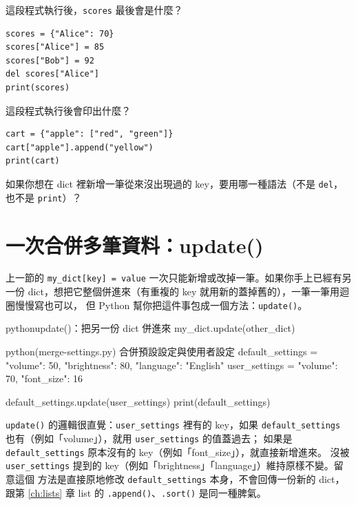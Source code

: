 \begin{drills}[label=drills:dict-modify]
\item 這段程式執行後，\texttt{scores} 最後會是什麼？
\begin{verbatim}
scores = {"Alice": 70}
scores["Alice"] = 85
scores["Bob"] = 92
del scores["Alice"]
print(scores)
\end{verbatim}
\item 這段程式執行後會印出什麼？
\begin{verbatim}
cart = {"apple": ["red", "green"]}
cart["apple"].append("yellow")
print(cart)
\end{verbatim}
\item 如果你想在 dict 裡新增一筆從來沒出現過的 key，要用哪一種語法（不是 \texttt{del}，
也不是 \texttt{print}）？
\end{drills}

\section{一次合併多筆資料：update()}
\label{sec:dict-update}

上一節的 \texttt{my\_dict[key] = value} 一次只能新增或改掉一筆。如果你手上已經有另一份
dict，想把它整個併進來（有重複的 key 就用新的蓋掉舊的），一筆一筆用迴圈慢慢寫也可以，
但 Python 幫你把這件事包成一個方法：\texttt{update()}。

\begin{code}{python}{update()：把另一份 dict 併進來}
my_dict.update(other_dict)
\end{code}

\begin{example}{python}{(merge-settings.py) 合併預設設定與使用者設定}
default_settings = {"volume": 50, "brightness": 80, "language": "English"}
user_settings = {"volume": 70, "font_size": 16}

default_settings.update(user_settings)
print(default_settings)
\end{example}


\texttt{update()} 的邏輯很直覺：\texttt{user\_settings} 裡有的 key，如果
\texttt{default\_settings} 也有（例如「volume」），就用 \texttt{user\_settings} 的值蓋過去；
如果是 \texttt{default\_settings} 原本沒有的 key（例如「font\_size」），就直接新增進來。
沒被 \texttt{user\_settings} 提到的 key（例如「brightness」「language」）維持原樣不變。留意這個
方法是直接原地修改 \texttt{default\_settings} 本身，不會回傳一份新的 dict，跟第 \ref{ch:lists} 章
list 的 \texttt{.append()}、\texttt{.sort()} 是同一種脾氣。

